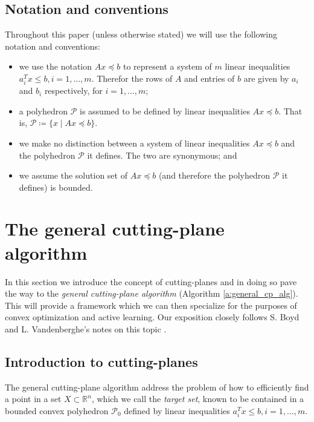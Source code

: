 \documentclass[11pt]{amsart}
\theoremstyle{definition}
\theoremstyle{remark}
\newcommand{\transpose}{T}
\begin{document}
    \subsection{Notation and conventions}
        Throughout this paper (unless otherwise stated) we will use the following notation and conventions: 
        \begin{itemize}
            \item we use the notation $Ax \preceq b$ to represent a system of $m$ linear inequalities $a_i^\transpose x \leq b, i = 1, \dots, m$. Therefor the rows of $A$ and entries of $b$ are given by $a_i$ and $b_i$ respectively, for $i = 1, \dots, m$;
            \item a polyhedron $\mathcal{P}$ is assumed to be defined by linear inequalities $Ax \preceq b$. That is, $\mathcal{P} \coloneqq \{x \;|\; Ax \preceq b\}$.
            \item we make no distinction between a system of linear inequalities $Ax \preceq b$ and the polyhedron $\mathcal{P}$ it defines. The two are synonymous; and 
            \item we assume the solution set of $Ax \preceq b$ (and therefore the polyhedron $\mathcal{P}$ it defines) is bounded. 
        \end{itemize}  


\section{The general cutting-plane algorithm}
    In this section we introduce the concept of cutting-planes and in doing so pave the way to the \emph{general cutting-plane algorithm} (Algorithm \ref{a:general_cp_alg}). This will provide a framework which we can then specialize for the purposes of convex optimization and active learning. Our exposition closely follows S. Boyd and L. Vandenberghe's notes on this topic \cite[Sections 1-3]{BV11}. 

    \subsection{Introduction to cutting-planes}
        The general cutting-plane algorithm address the problem of how to efficiently find a point in a set $X \subset \mathbb{R}^n$, which we call the \emph{target set}, known to be contained in a bounded convex polyhedron $\mathcal{P}_0$ defined by linear inequalities $a_i^\transpose x \leq b, i = 1, \dots, m$. 
\end{document}
